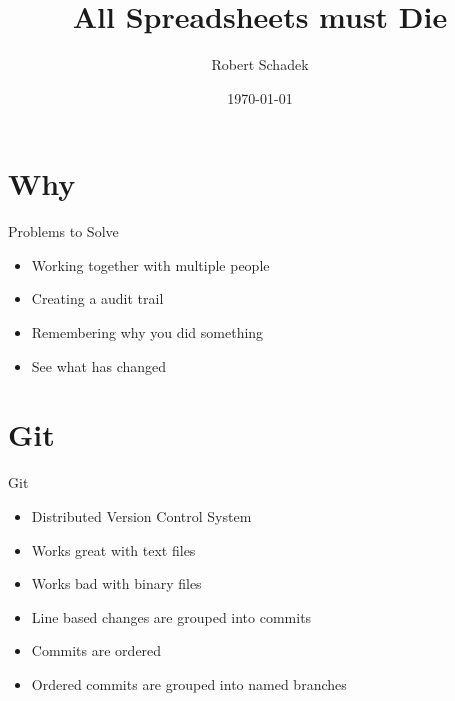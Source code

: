 \documentclass[aspectratio=169]{beamer}
\title{All Spreadsheets must Die}
\date{\today}
\author{Robert Schadek}
\begin{document}
	\maketitle

	\section{Why}
	\begin{frame}{Problems to Solve}
		\begin{itemize}
			\item Working together with multiple people
			\item Creating a audit trail			
			\item Remembering why you did something
			\item See what has changed
		\end{itemize}
	\end{frame}

	\section{Git}
	\begin{frame}{Git}
		\begin{itemize}
			\item Distributed Version Control System
			\item Works great with text files
			\item Works bad with binary files
		\end{itemize}
		\vfill
		\begin{itemize}
			\item Line based changes are grouped into commits
			\item Commits are ordered
			\item Ordered commits are grouped into named branches
		\end{itemize}	
	\end{frame}
\end{document}

